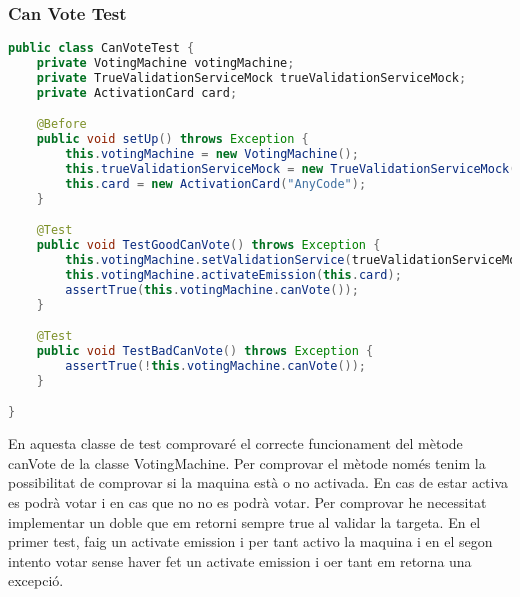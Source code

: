 \documentclass[11pt]{article}
\begin{document}
	\subsubsection{Can Vote Test}
	\begin{lstlisting}[basicstyle=\ttfamily\scriptsize,language=Java]
public class CanVoteTest {
    private VotingMachine votingMachine;
    private TrueValidationServiceMock trueValidationServiceMock;
    private ActivationCard card;

    @Before
    public void setUp() throws Exception {
        this.votingMachine = new VotingMachine();
        this.trueValidationServiceMock = new TrueValidationServiceMock();
        this.card = new ActivationCard("AnyCode");
    }

    @Test
    public void TestGoodCanVote() throws Exception {
        this.votingMachine.setValidationService(trueValidationServiceMock);
        this.votingMachine.activateEmission(this.card);
        assertTrue(this.votingMachine.canVote());
    }

    @Test
    public void TestBadCanVote() throws Exception {
        assertTrue(!this.votingMachine.canVote());
    }

}
	\end{lstlisting}
	En aquesta classe de test comprovaré el correcte funcionament del mètode canVote de la classe VotingMachine. Per comprovar el mètode només tenim la possibilitat de comprovar si la maquina està o no activada. En cas de estar activa es podrà votar i en cas que no no es podrà votar. Per comprovar he necessitat implementar un doble que em retorni sempre true al validar la targeta. En el primer test, faig un activate emission i per tant activo la maquina i en el segon intento votar sense haver fet un activate emission i oer tant em retorna una excepció.
\end{document}

